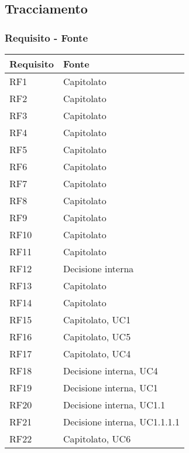 \subsection{Tracciamento}

\subsubsection{Requisito - Fonte}

\begin{center}
    \begin{longtable}{|C{5cm}|C{5cm}|}
        \hline
        \textbf{Requisito} & \textbf{Fonte} \\
        \hline
        RF1 & Capitolato \\
        \hline
        RF2 & Capitolato \\
        \hline
        RF3 & Capitolato \\
        \hline
        RF4 & Capitolato \\
        \hline
        RF5 & Capitolato \\
        \hline
        RF6 & Capitolato \\
        \hline
        RF7 & Capitolato \\
        \hline
        RF8 & Capitolato \\
        \hline
        RF9 & Capitolato \\
        \hline
        RF10 & Capitolato \\
        \hline
        RF11 & Capitolato \\
        \hline
        RF12 & Decisione interna \\
        \hline
        RF13 & Capitolato \\
        \hline
        RF14 & Capitolato \\
        \hline
        RF15 & Capitolato, UC1 \\
        \hline
        RF16 & Capitolato, UC5 \\
        \hline
        RF17 & Capitolato, UC4 \\
        \hline
        RF18 & Decisione interna, UC4 \\
        \hline
        RF19 & Decisione interna, UC1 \\
        \hline
        RF20 & Decisione interna, UC1.1 \\
        \hline
        RF21 & Decisione interna, UC1.1.1.1 \\
        \hline
        RF22 & Capitolato, UC6 \\

\end{longtable}
\end{center}
